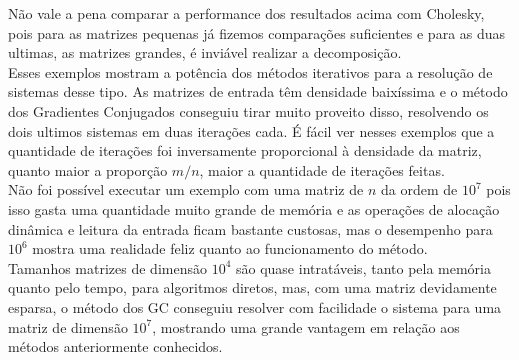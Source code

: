 \documentclass[
10pt, %
a4paper, %
oneside, %
headinclude,footinclude, %
BCOR5mm, %
]{scrartcl}
\begin{document}
Não vale a pena comparar a performance dos resultados acima com Cholesky, pois para as matrizes pequenas já fizemos comparações suficientes e para as duas ultimas, as matrizes grandes, é inviável realizar a decomposição. \\
Esses exemplos mostram a potência dos métodos iterativos para a resolução de sistemas desse tipo. As matrizes de entrada têm densidade baixíssima e o método dos Gradientes Conjugados conseguiu tirar muito proveito disso, resolvendo os dois ultimos sistemas em duas iterações cada. É fácil ver nesses exemplos que a quantidade de iterações foi inversamente proporcional à densidade da matriz, quanto maior a proporção $m/n$, maior a quantidade de iterações feitas. \\
Não foi possível executar um exemplo com uma matriz de $n$ da ordem de $10^7$ pois isso gasta uma quantidade muito grande de memória e as operações de alocação dinâmica e leitura da entrada ficam bastante custosas, mas o desempenho para $10^6$ mostra uma realidade feliz quanto ao funcionamento do método. \\
Tamanhos matrizes de dimensão $10^4$ são quase intratáveis, tanto pela memória quanto pelo tempo, para algoritmos diretos, mas, com uma matriz devidamente esparsa, o método dos GC conseguiu resolver com facilidade o sistema para uma matriz de dimensão $10^7$, mostrando uma grande vantagem em relação aos métodos anteriormente conhecidos.



\renewcommand{\refname}{\spacedlowsmallcaps{Bibliografia}} %


\end{document}
